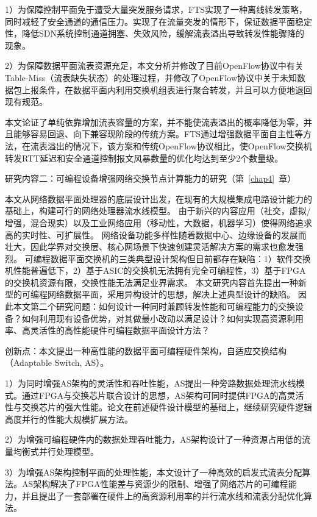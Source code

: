 1）为保障控制平面免于遭受大量突发服务请求，FTS实现了一种离线转发策略，同时减轻了安全通道的通信压力。实现了在流量突发的情形下，保证数据平面稳定性，降低SDN系统控制通道拥塞、失效风险，缓解流表溢出导致转发性能骤降的现象。

2）为保障数据平面流表资源充足，本文分析并修改了目前OpenFlow协议中有关Table-Miss（流表缺失状态）的处理过程，并修改了OpenFlow协议中关于未知数据包上报条件，在数据平面内利用交换机组表进行聚合转发，并且可以方便地退回现有规范。

本文论证了单纯依靠增加流表容量的方案，并不能使流表溢出的概率降低为零，并且能够容易回退、向下兼容现阶段的传统方案。FTS通过增强数据平面自主性等方法，在流表溢出的情况下，该方案和传统OpenFlow协议相比，使OpenFlow交换机转发RTT延迟和安全通道控制报文风暴数量的优化均达到至少2个数量级。



{\hei 研究内容二：可编程设备增强网络交换节点计算能力的研究（第~\ref{chap4}~章）}

{\hei 本文从网络数据平面处理器的底层设计出发，在现有的大规模集成电路设计能力的基础上，构建可行的网络处理器流水线模型。}
由于新兴的内容应用（社交，虚拟/增强，混合现实）以及工业网络应用（移动性，大数据，机器学习）使得网络追求高的实时性、可扩展性。
网络设备功能多样性随着数据中心、边缘设备的发展而壮大，因此学界对交换层、核心网场景下快速创建灵活解决方案的需求也愈发强烈。
可编程数据平面交换机的三类典型设计架构但目前都存在缺陷：1）软件交换机性能普遍低下，2）基于ASIC的交换机无法拥有完全可编程性，3）基于FPGA的交换机资源有限，交换性能无法满足业界需求。
本文研究内容首先提出一种新型的可编程网络数据平面，采用异构设计的思想，解决上述典型设计的缺陷。
因此本文第二个研究问题：如何设计一种同时兼顾转发性能和可编程能力的交换设备？如何利用现有设备优势，对其做最小改动以满足设计？如何实现高资源利用率、高灵活性的高性能硬件可编程数据平面设计方法？

{\hei 创新点：}本文提出一种高性能的数据平面可编程硬件架构，自适应交换结构（Adaptable Switch, AS）。

1）为同时增强AS架构的灵活性和吞吐性能，AS提出一种旁路数据处理流水线模式。通过FPGA与交换芯片联合设计的思想，AS架构可同时提供FPGA的高灵活性与交换芯片的强大性能。论文在前述硬件设计模型的基础上，继续研究硬件逻辑高度并行的性能大规模扩展方法。

2）为增强可编程硬件内的数据处理吞吐能力，AS架构设计了一种资源占用低的流量均衡式并行处理模型。

3）为增强AS架构控制平面的处理性能，本文设计了一种高效的启发式流表分配算法。AS架构解决了FPGA性能差与资源少的限制、增强了网络芯片的可编程能力，并且提出了一套部署在硬件上的高资源利用率的并行流水线和流表分配优化算法。

